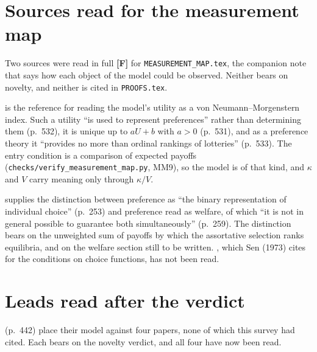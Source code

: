 \documentclass[11pt,a4paper]{article}
\begin{document}
\section{Sources read for the measurement map}
\label{sec:measurement}

Two sources were read in full \textbf{[F]} for \texttt{MEASUREMENT\_MAP.tex},
the companion note that says how each object of the model could be observed.
Neither bears on novelty, and neither is cited in \texttt{PROOFS.tex}.

\citet{Schoemaker1982} is the reference for reading the model's utility as a
von Neumann--Morgenstern index. Such a utility ``is used to represent
preferences'' rather than determining them (p.~532), it is unique up to $aU+b$
with $a>0$ (p.~531), and as a preference theory it ``provides no more than
ordinal rankings of lotteries'' (p.~533). The entry condition is a comparison of
expected payoffs (\texttt{checks/verify\_measurement\_map.py}, MM9), so the
model is of that kind, and $\kappa$ and $V$ carry meaning only through
$\kappa/V$.

\citet{Sen1973} supplies the distinction between preference as ``the binary
representation of individual choice'' (p.~253) and preference read as welfare,
of which ``it is not in general possible to guarantee both simultaneously''
(p.~259). The distinction bears on the unweighted sum of payoffs by which the
assortative selection ranks equilibria, and on the welfare section still to be
written. \citet{Sen1971}, which Sen (1973) cites for the conditions on choice
functions, has not been read.

\section{Leads read after the verdict}
\label{sec:unread}

\citet{MorganOrzenSefton2012} (p.~442) place their model against four papers,
none of which this survey had cited. Each bears on the novelty verdict, and all
four have now been read.
\end{document}
